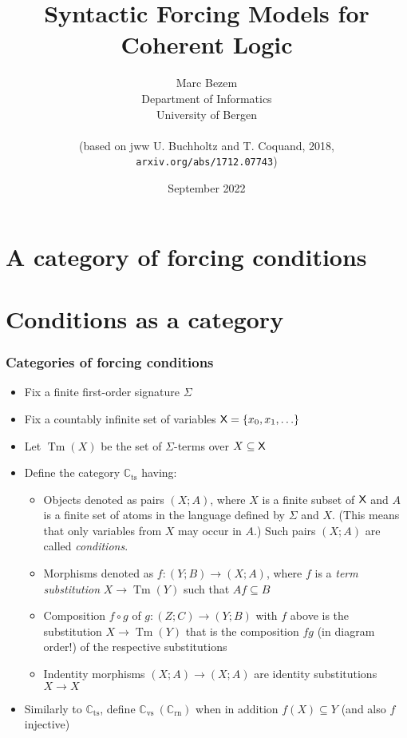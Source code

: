 \documentclass[handout,11pt]{beamer}
\title{Syntactic Forcing Models for Coherent Logic}
\author{Marc Bezem\\
Department of Informatics\\
University of Bergen\\
\mbox{ }\\
(based on jww U. Buchholtz and T. Coquand, 2018,\\
{\tt arxiv.org/abs/1712.07743})
}
\date{September 2022}
\newcommand{\set}[1]{\{#1\}}
\newcommand{\XX}{\mbox{\sf X}}
\newcommand*{\subvs}{_{\mathrm{vs}}}
\newcommand*{\subrn}{_{\mathrm{rn}}}
\newcommand*{\subts}{_{\mathrm{ts}}}
\newcommand{\Cvs}{\mathbb{C}\subvs}
\newcommand{\Crn}{\mathbb{C}\subrn}
\newcommand{\Cts}{\mathbb{C}\subts}
\DeclareMathOperator{\Tm}{Tm}
\begin{document}
\frame{\titlepage}

\section[Outline]{}
\frame{\tableofcontents}


\section{A category of forcing conditions}

\section{Conditions as a category}

\begin{frame}
\frametitle{Categories of forcing conditions}
 \begin{itemize}[<+->]   %
   \item Fix a finite first-order signature $\Sigma$
   \item Fix a countably infinite set of variables $\XX=\set{x_0,x_1,\ldots}$
   \item Let $\Tm(X)$ be the set of $\Sigma$-terms over $X \subseteq \XX$    
   \item Define the category $\Cts$ having:
    \begin{itemize}[<+->]   %
    \item Objects denoted as pairs $(X;A)$,
    where $X$ is a finite subset of $\XX$ and $A$ is a finite set
    of atoms in the language defined by $\Sigma$ and $X$.
    (This means that only variables from $X$ may occur in $A$.)
    Such pairs $(X;A)$ are called \emph{conditions}.
    \item Morphisms denoted as $f : (Y;B) \to (X;A)$, where $f$ is a 
    \emph{term substitution} $X \to \Tm(Y)$ such that $Af \subseteq B$
    \item Composition $f\circ g$ of $g : (Z;C) \to (Y;B)$ with $f$ above is
    the substitution $X \to \Tm(Y)$ that is the composition $fg$
    (in diagram order!) of the respective substitutions
    \item Indentity morphisms $(X;A)\to(X;A)$ are identity 
    substitutions $X\to X$
    \end{itemize}
    \item Similarly to $\Cts$, define $\Cvs~(\Crn)$ when 
    in addition $f(X)\subseteq Y$ (and also $f$ injective)
 \end{itemize}
\end{frame}
\end{document}
